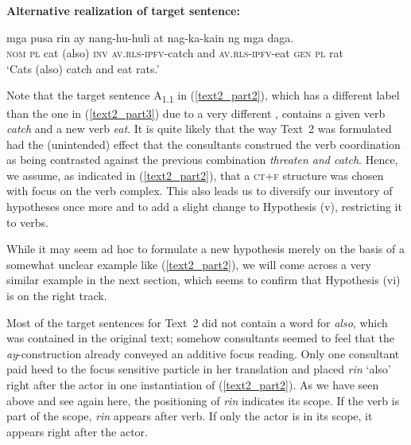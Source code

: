 \documentclass[output=paper,
,modfonts
,nonflat]{langsci/langscibook}
\begin{document}
\begin{exe}
\ex\label{text2_part2}\textbf{Alternative realization of target sentence:}
\begin{xlist}
\end{xlist}
\begin{xlist}[{>}>{>}> A\textsubscript{{1.1}}:]
 mga {pusa{\cb}\ctopic} {\USOParen}rin{\USCParen} ay {{\ob}nang-hu-huli} at {nag-ka-kain{\cb}\focus} {{\ob}ng} mga {daga{\cb}\topic{\cb}\sq}.\\
\textsc{\void{[[}nom} \textsc{pl} cat (also) \textsc{inv} \textsc{\void{[}av.rls-ipfv}-catch and \textsc{av.rls-ipfv}-eat \textsc{\void{[}gen} \textsc{pl} rat\\
\glt `Cats (also) catch and eat rats.'
\end{xlist}
\end{exe}

\noindent Note that the target sentence A\textsubscript{{1.1}} in (\ref{text2_part2}), which has a different label than the one in (\ref{text2_part3}) due to a very different ,  contains a given verb \textit{catch} and a new verb \textit{eat}. It is quite likely that the way Text~2 was formulated had the (unintended) effect that the consultants construed the verb coordination as being contrasted against the previous combination \textit{threaten and catch}. Hence, we assume, as indicated in (\ref{text2_part2}), that a \textsc{ct+f} structure was chosen with focus on the verb complex. This also leads us to diversify our inventory of hypotheses once more and to add a slight change to Hypothesis (v), restricting it to  verbs.



\noindent While it may seem ad hoc to formulate a new hypothesis merely on the basis of a somewhat unclear example like (\ref{text2_part2}), we will come across a very similar example in the next section, which seems to confirm that Hypothesis (vi) is on the right track.

Most of the  target sentences for Text~2 did not contain a word for \textit{also}, which was contained in the original  text; somehow consultants seemed to feel that the \textit{ay}-construction already conveyed an additive focus reading. Only one consultant paid heed to the focus sensitive particle in her translation and placed \textit{rin} `also' right after the actor in one instantiation of (\ref{text2_part2}). As we have seen above and see again here, the positioning of \textit{rin} indicates its scope. If the verb is part of the scope, \textit{rin} appears after verb. If only the actor is in its scope, it appears right after the actor. 
\end{document}

